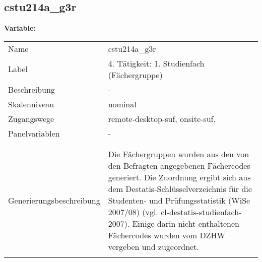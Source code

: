 	
	
	\subsection{cstu214a\_g3r}
	\label{subSection:cstu214a_g3r}

	\noindent\textbf{Variable:}\\
		\begin{tabular}{lL{11.3cm}}
			\label{tableVariable:cstu214a_g3r}
			Name & cstu214a\_g3r \\
			Label & 4. Tätigkeit: 1. Studienfach (Fächergruppe) \\
			Beschreibung & - \\
			Skalenniveau & nominal \\
			Zugangswege &
				remote-desktop-suf,
				onsite-suf,
 \\
			Panelvariablen & -
			 \\
			 \\
 \\
					Generierungsbeschreibung & Die Fächergruppen wurden aus den von den Befragten angegebenen Fächercodes generiert. Die Zuordnung ergibt sich aus dem Destatis-Schlüsselverzeichnis für die Studenten- und Prüfungsstatistik (WiSe 2007/08) (vgl. cl-destatis-studienfach-2007).  Einige darin nicht enthaltenen Fächercodes wurden vom DZHW vergeben und zugeordnet. 
				 \\	
			 \\
		\end{tabular}






